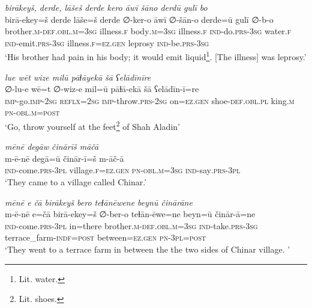 \ea \label{DG.22}
\textit{birākeyš, derde, lāšeš derde kero āwī šāno derdū gulī bo} \\ 
\gll birā-ekey=š derde lāše=š derde ∅-ker-o āwī ∅-šān-o derde=ū gulī ∅-b-o \\ 
 brother\textsc{.m}\textsc{-def}\textsc{.obl}\textsc{.m}\textsc{=3sg} illness\textsc{\textsc{.f}} body\textsc{.m}\textsc{=3sg} illness\textsc{\textsc{.f}} \textsc{ind-}do\textsc{.prs}\textsc{-3sg} water\textsc{\textsc{.f}} \textsc{ind-}emit\textsc{.prs}\textsc{-3sg} illness\textsc{\textsc{.f}}\textsc{=ez}\textsc{.gen} leprosy \textsc{ind-}be\textsc{.prs}\textsc{-3sg} \\ 
\glt `His brother had pain in his body; it would emit liquid\footnote{Lit. water.}. [The illness] was leprosy.'
\z 
 
\ea \label{DG.27}
\textit{lue wēt wize milū pāɫāyekā šā ʕelādīnīre} \\ 
\gll ∅-lu-e wē=t ∅-wiz-e mil=ū pāɫā-ekā šā ʕelādīn-ī=re \\ 
 \textsc{imp-}go.\textsc{imp-}\textsc{2sg} \textsc{reflx}\textsc{=\textsc{2sg}} \textsc{imp-}throw\textsc{.prs}-\textsc{2sg} on\textsc{=ez}\textsc{.gen} shoe\textsc{-def}\textsc{.obl}\textsc{.pl} king\textsc{.m} \textsc{pn}\textsc{-obl}\textsc{.m}\textsc{=\textsc{post}} \\ 
\glt `Go, throw yourself at the feet\footnote{Lit. shoes.} of Shah Aladin'
\z 
 
\ea \label{DG.30}
\textit{mēnē degāw činārīš māčā} \\ 
\gll m-ē-nē degā=ū činār-ī=š m-āč-ā \\ 
 \textsc{ind-}come\textsc{.prs}\textsc{-3pl} village\textsc{\textsc{.f}}\textsc{=ez}\textsc{.gen} \textsc{pn}\textsc{-obl}\textsc{.m}\textsc{=3sg} \textsc{ind-}say\textsc{.prs}\textsc{-3pl} \\ 
\glt `They came to a village called Chinar.'
\z 
 
\ea \label{DG.31}
\textit{mēnē e čā birākeyš bero teɫānēwene beynū činārāne} \\ 
\gll m-ē-nē e=čā birā-ekey=š ∅-ber-o teɫān-ēwe=ne beyn=ū činār-ā=ne \\ 
 \textsc{ind-}come\textsc{.prs}\textsc{-3pl} in=there brother\textsc{.m}\textsc{-def}\textsc{.obl}\textsc{.m}\textsc{=3sg} \textsc{ind-}take\textsc{.prs}\textsc{-3sg} terrace\_farm\textsc{-indf}\textsc{=\textsc{post}} between\textsc{=ez}\textsc{.gen} \textsc{pn}\textsc{-3pl}\textsc{=\textsc{post}} \\ 
\glt `They went to a terrace farm in between the the two sides of Chinar village. '
\z 
 
